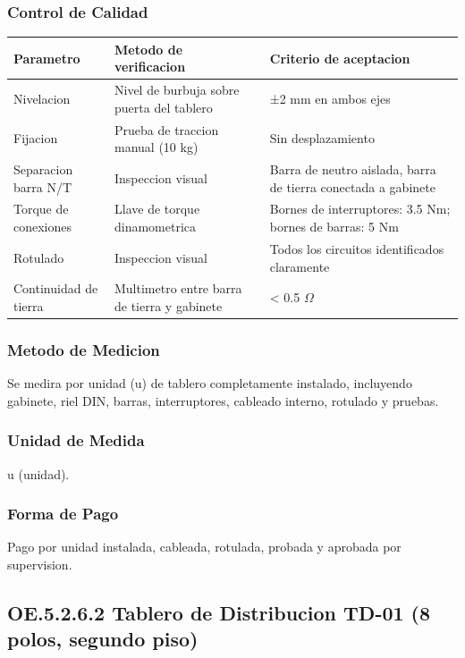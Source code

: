 \subsubsection{Control de Calidad}

\begin{longtable}{L{4.5cm} L{4.5cm} L{4.5cm}}
\toprule
\textbf{Parametro} & \textbf{Metodo de verificacion} & \textbf{Criterio de aceptacion} \\
\midrule
Nivelacion & Nivel de burbuja sobre puerta del tablero & ±2 mm en ambos ejes \\
Fijacion & Prueba de traccion manual (10 kg) & Sin desplazamiento \\
Separacion barra N/T & Inspeccion visual & Barra de neutro aislada, barra de tierra conectada a gabinete \\
Torque de conexiones & Llave de torque dinamometrica & Bornes de interruptores: 3.5 Nm; bornes de barras: 5 Nm \\
Rotulado & Inspeccion visual & Todos los circuitos identificados claramente \\
Continuidad de tierra & Multimetro entre barra de tierra y gabinete & < 0.5 $\Omega$ \\
\bottomrule
\end{longtable}

\subsubsection{Metodo de Medicion}

Se medira por unidad (u) de tablero completamente instalado, incluyendo gabinete, riel DIN, barras, interruptores, cableado interno, rotulado y pruebas.

\subsubsection{Unidad de Medida}

u (unidad).

\subsubsection{Forma de Pago}

Pago por unidad instalada, cableada, rotulada, probada y aprobada por supervision.

\subsection{OE.5.2.6.2 Tablero de Distribucion TD-01 (8 polos, segundo piso)}

